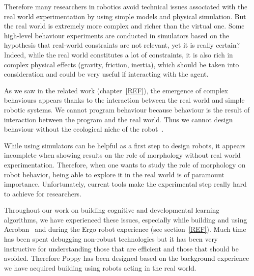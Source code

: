 Therefore many researchers in robotics avoid technical issues associated with the real world experimentation by using simple models and physical simulation. But the real world is extremely more complex and richer than the virtual one.
Some high-level behaviour experiments are conducted in simulators based on the hypothesis that real-world constraints are not relevant, yet it is really certain?
Indeed, while the real world constitutes a lot of constraints, it is also rich in complex physical effects (gravity, friction, inertia), which should be taken into consideration and could be very useful if interacting with the agent.

As we saw in the related work (chapter~\ref{REF}), the emergence of complex behaviours appears thanks to the interaction between the real world and simple robotic systems. We cannot program behaviour because behaviour is the result of interaction  between the program and the real world. Thus we cannot design behaviour without the ecological niche of the robot~\cite{Steels1991emergence}.

While using simulators can be helpful as a first step to design robots, it appears incomplete when showing results on the role of morphology without real world experimentation.
Therefore, when one wants to study the role of morphology on robot behavior, being able to explore it in the real world is of paramount importance. Unfortunately, current tools make the experimental step really hard to achieve for researchers.

Throughout our work on building cognitive and developmental learning algorithms, we have experienced these issues, especially while building and using Acroban~\cite{Ly2010} and during the Ergo robot experience (see section~\ref{REF}). Much time has been spent debugging non-robust technologies but it has been very instructive for understanding those that are efficient and those that should be avoided.
Therefore Poppy has been designed based on the background experience we have acquired building using robots acting in the real world.

